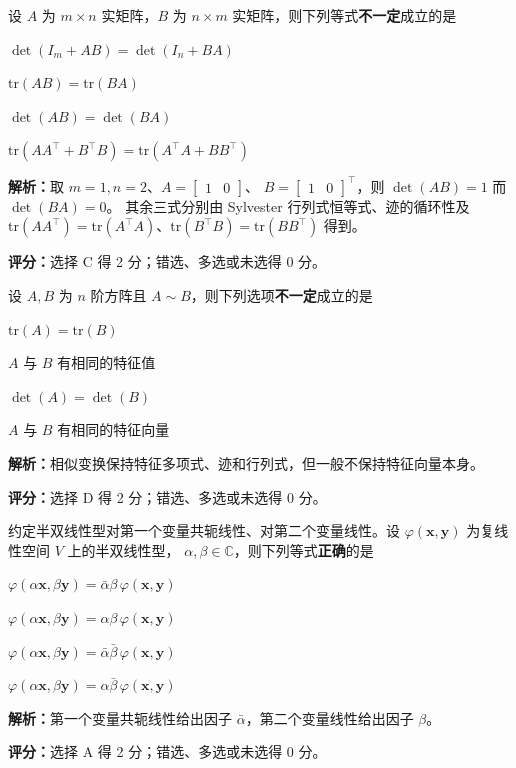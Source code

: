 \documentclass[10pt,a4paper]{exam-zh}
\newcommand{\bvec}[1]{\boldsymbol{#1}}
\newcommand{\tr}{\mathrm{tr}}
\newcommand{\C}{\mathbb{C}}
\newcommand{\shortgrading}[1]{%
  \par\smallskip\noindent\textcolor{gradingred}{\textbf{评分：}}#1\par}
\begin{document}
\begin{question}
  设 $A$ 为 $m \times n$ 实矩阵，$B$ 为 $n \times m$ 实矩阵，则下列等式\textbf{不一定}成立的是 \paren[C]
  \begin{choices}
    \item $\det\left(I_m+AB\right)=\det\left(I_n+BA\right)$
    \item $\tr\left(AB\right)=\tr\left(BA\right)$
    \item $\det(AB) = \det(BA)$
    \item $\tr\left(AA^\top+B^\top B\right)
      =\tr\left(A^\top A+BB^\top\right)$
  \end{choices}
  \textbf{解析：}取 $m=1,n=2$、$A=\begin{bmatrix}1&0\end{bmatrix}$、
  $B=\begin{bmatrix}1&0\end{bmatrix}^{\top}$，则 $\det(AB)=1$ 而 $\det(BA)=0$。
  其余三式分别由 Sylvester 行列式恒等式、迹的循环性及
  $\tr(AA^\top)=\tr(A^\top A)$、$\tr(B^\top B)=\tr(BB^\top)$ 得到。
  \shortgrading{选择 C 得 2 分；错选、多选或未选得 0 分。}
\end{question}

\begin{question}
  设 $A, B$ 为 $n$ 阶方阵且 $A \sim B$，则下列选项\textbf{不一定}成立的是 \paren[D]
  \begin{choices}
    \item $\tr(A) = \tr(B)$
    \item $A$ 与 $B$ 有相同的特征值
    \item $\det(A) = \det(B)$
    \item $A$ 与 $B$ 有相同的特征向量
  \end{choices}
  \textbf{解析：}相似变换保持特征多项式、迹和行列式，但一般不保持特征向量本身。
  \shortgrading{选择 D 得 2 分；错选、多选或未选得 0 分。}
\end{question}

\begin{question}
  约定半双线性型对第一个变量共轭线性、对第二个变量线性。设
  $\varphi(\bvec{x}, \bvec{y})$ 为复线性空间 $V$ 上的半双线性型，
  $\alpha,\beta\in\C$，则下列等式\textbf{正确}的是 \paren[A]
  \begin{choices}
    \item $\varphi(\alpha\bvec{x},\beta\bvec{y})
      = \bar{\alpha}\beta\,\varphi(\bvec{x},\bvec{y})$
    \item $\varphi(\alpha\bvec{x},\beta\bvec{y})
      = \alpha\beta\,\varphi(\bvec{x},\bvec{y})$
    \item $\varphi(\alpha\bvec{x},\beta\bvec{y})
      = \bar{\alpha}\bar{\beta}\,\varphi(\bvec{x},\bvec{y})$
    \item $\varphi(\alpha\bvec{x},\beta\bvec{y})
      = \alpha\bar{\beta}\,\varphi(\bvec{x},\bvec{y})$
  \end{choices}
  \textbf{解析：}第一个变量共轭线性给出因子 $\bar\alpha$，第二个变量线性给出因子 $\beta$。
  \shortgrading{选择 A 得 2 分；错选、多选或未选得 0 分。}
\end{question}
\end{document}
